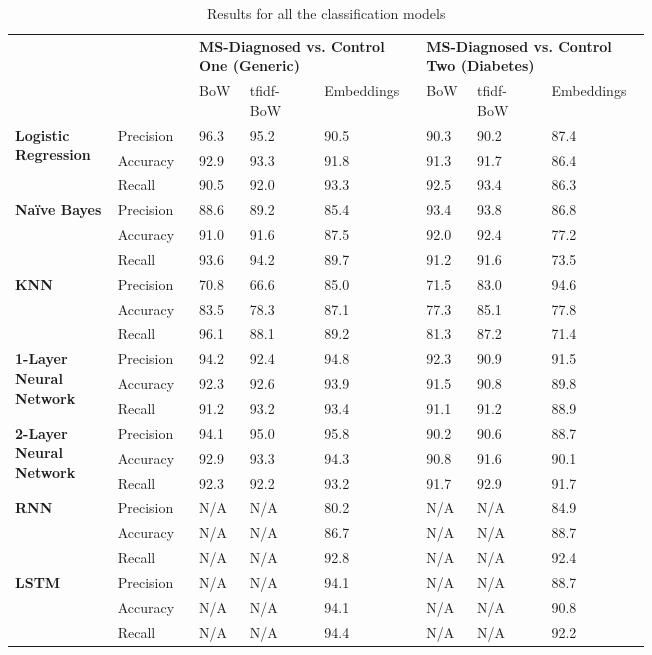\documentclass[11pt,a4paper]{article}
\begin{document}
\begin{table}
\centering
\begin{tabular}{p{0.12\linewidth}p{0.1\linewidth}p{0.05\linewidth}p{0.1\linewidth}p{0.12\linewidth}p{0.05\linewidth}p{0.1\linewidth}p{0.1\linewidth}}
\hline\hline
 & & \multicolumn{3}{C{0.25\linewidth}}{\textbf{MS-Diagnosed vs. Control One (Generic)}} & \multicolumn{3}{C{0.25\linewidth}}{\textbf{MS-Diagnosed vs. Control Two (Diabetes)}}\\
 & & BoW & tfidf-BoW & Embeddings &  BoW & tfidf-BoW & Embeddings\\
\hline
\multirow{3}{\linewidth}{\textbf{Logistic Regression}} & Precision & 96.3 & 95.2	& 90.5 & 90.3 & 90.2 & 87.4\\
 & Accuracy & 92.9 & 93.3 & 91.8 & 91.3 & 91.7 & 86.4 \\
 & Recall & 90.5 & 92.0 & 93.3 & 92.5 & 93.4 & 86.3 \\
\hline
\multirow{3}{\linewidth}{\textbf{Naïve Bayes}} & Precision & 88.6 & 89.2 & 85.4 & 93.4 & 93.8 & 86.8\\
 & Accuracy & 91.0 & 91.6 & 87.5 & 92.0 & 92.4 & 77.2\\
 & Recall & 93.6 & 94.2 & 89.7 & 91.2 & 91.6 & 73.5\\
\hline
\multirow{3}{\linewidth}{\textbf{KNN}} & Precision & 70.8	& 66.6 & 85.0 & 71.5 & 83.0 & 94.6\\
 & Accuracy & 83.5 & 78.3 & 87.1 & 77.3 & 85.1 & 77.8\\
 & Recall & 96.1 & 88.1 & 89.2 & 81.3 & 87.2 & 71.4\\
\hline
\multirow{3}{\linewidth}{\textbf{1-Layer Neural Network}} & Precision & 94.2 & 92.4 & 94.8 & 92.3 & 90.9 & 91.5\\
 & Accuracy & 92.3 & 92.6 & 93.9 & 91.5 & 90.8 & 89.8\\
 & Recall & 91.2 & 93.2 & 93.4 & 91.1 & 91.2 & 88.9\\
\hline
\multirow{3}{\linewidth}{\textbf{2-Layer Neural Network}} & Precision & 94.1 & 95.0 & 95.8 & 90.2 & 90.6 & 88.7\\
 & Accuracy & 92.9 & 93.3 & 94.3 & 90.8 & 91.6 & 90.1\\
 & Recall & 92.3 & 92.2 & 93.2 & 91.7 & 92.9 & 91.7\\
\hline
\multirow{3}{\linewidth}{\textbf{RNN}} & Precision & N/A & N/A & 80.2 & N/A & N/A & 84.9\\
 & Accuracy & N/A & N/A & 86.7 & N/A & N/A & 88.7\\
 & Recall & N/A & N/A & 92.8 & N/A & N/A & 92.4\\
\hline
\multirow{3}{\linewidth}{\textbf{LSTM}} & Precision & N/A & N/A & 94.1 & N/A & N/A & 88.7\\
 & Accuracy & N/A & N/A & 94.1 & N/A & N/A & 90.8\\
 & Recall & N/A & N/A & 94.4 & N/A & N/A & 92.2\\
\hline\hline
\end{tabular}
\caption{Results for all the classification models}
\label{tab:results}
\end{table}
\end{document}
